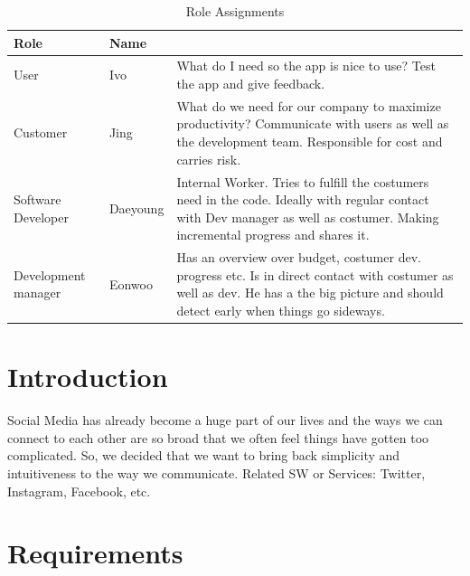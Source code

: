 \documentclass[conference]{IEEEtran}
\numberwithin{figure}{subsection}
\begin{document}
\begin{table}[ht!] \renewcommand\arraystretch{1.25}
  \begin{threeparttable}
      \caption{Role Assignments%
      \label{tab:table1}}    %
      \begin{tabular}{@{}l l>{\raggedright\arraybackslash}p{3.8cm}@{}}
      \toprule
      \bfseries Role & \bfseries Name & \multicolumn{1}{l}{\bfseries Task description and etc.} \\
      \midrule
      User & Ivo & What do I need so the app is nice to use? Test the app and give feedback.\\
      
      Customer & Jing & What do we need for our company to maximize productivity? Communicate with users as well as the development team. Responsible for cost and carries risk.\\
      
      Software Developer & Daeyoung & Internal Worker. Tries to fulfill the costumers need in the code. Ideally with regular contact with Dev manager as well as costumer. Making incremental progress and shares it.\\
      
      Development manager & Eonwoo & Has an overview over budget, costumer dev. progress etc. Is in direct contact with costumer as well as dev. He has a the big picture and should detect early when things go sideways.\\
      \bottomrule
      \end{tabular}
  \end{threeparttable}
\end{table}


\newline
\section{Introduction} 
Social Media has already become a huge part of our lives and the ways we can connect to each other are so broad that we often feel things have gotten too complicated. So, we decided that we want to bring back simplicity and intuitiveness to the way we communicate. Related SW or Services: Twitter, Instagram, Facebook, etc. 
\newline

\section{Requirements}
\end{document}
